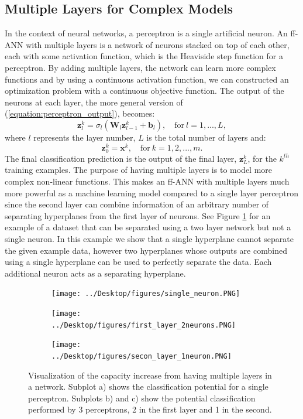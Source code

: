 \documentclass[letterpaper,12pt,titlepage,oneside,final]{book}
\begin{document}
	\subsection{Multiple Layers for Complex Models}
	
	In the context of neural networks, a perceptron is a single artificial neuron. An ff-ANN with multiple layers is a network of neurons stacked on top of each other, each with some activation function, which is the Heaviside step function for a perceptron. By adding multiple layers, the network can learn more complex functions and by using a continuous activation function, we can constructed an optimization problem with a continuous objective function. The output of the neurons at each layer, the more general version of (\ref{equation:perceptron_output}), becomes:
	\begin{equation}
	\mathbf{z}_{l}^{k} = \sigma_{l}(\mathbf{W}_{l}\mathbf{z}_{l-1}^{k} + \mathbf{b}_{l}), \quad \text{for} \ l = 1, ... , L,
	\end{equation}
	where $l$ represents the layer number, $L$ is the total number of layers and:
	\begin{equation}
	\mathbf{z}_{0}^{k} = \mathbf{x}^{k}, \quad \text{for} \ k=1, 2, ... , m.
	\end{equation}
	The final classification prediction is the output of the final layer, $\mathbf{z}_{L}^{k}$, for the $k^{th}$ training examples. The purpose of having multiple layers is to model more complex non-linear functions. This makes an ff-ANN with multiple layers much more powerful as a machine learning model compared to a single layer perceptron since the second layer can combine information of an arbitrary number of separating hyperplanes from the first layer of neurons. See Figure \ref{figure:MLP} for an example of a dataset that can be separated using a two layer network but not a single neuron. In this example we show that a single hyperplane cannot separate the given example data, however two hyperplanes whose outputs are combined using a single hyperplane can be used to perfectly separate the data. Each additional neuron acts as a separating hyperplane.
	\begin{figure}
		\centering
		\begin{subfigure}{.3\textwidth}
			\texttt{[image: ../Desktop/figures/single\_neuron.PNG]}
			\caption{}
		\end{subfigure}
		\begin{subfigure}{.3\textwidth}
			\texttt{[image: ../Desktop/figures/first\_layer\_2neurons.PNG]}
			\caption{}
		\end{subfigure}
		\begin{subfigure}{.3\textwidth}
			\texttt{[image: ../Desktop/figures/secon\_layer\_1neuron.PNG]}
			\caption{}
		\end{subfigure}
		\caption{Visualization of the capacity increase from having multiple layers in a network. Subplot a) shows the classification potential for a single perceptron. Subplots b) and c) show the potential classification performed by 3 perceptrons, 2 in the first layer and 1 in the second.}
		\label{figure:MLP}
	\end{figure}
	
\end{document}
